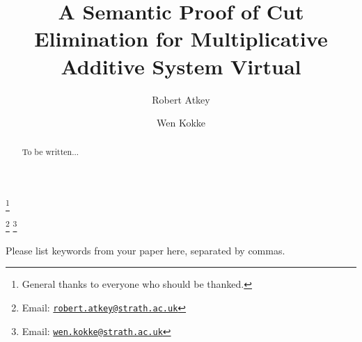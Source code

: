 \documentclass[twoside,11pt]{entics}
\begin{document}
\begin{frontmatter}
  \title{A Semantic Proof of Cut Elimination for Multiplicative Additive System Virtual}
  \thanks[ALL]{General thanks to everyone who should be thanked.}
  \author{Robert Atkey}
  \author{Wen Kokke}
  \address[msp]{%
    Mathematically Structured Programming\\
    Computer and Information Sciences\\
    University of Strathclyde\\
    Glasgow, Scotland, UK}
  \thanks[bobemail]%
  {Email: \href{robert.atkey@strath.ac.uk}%
    {\texttt{\normalshape robert.atkey@strath.ac.uk}}}
  \thanks[wenemail]%
  {Email: \href{wen.kokke@strath.ac.uk}%
    {\texttt{\normalshape wen.kokke@strath.ac.uk}}}
  \begin{abstract}
    To be written...
  \end{abstract}
  \begin{keyword}
    Please list keywords from your paper here, separated by commas.
  \end{keyword}
\end{frontmatter}



\cite{Horne15:mav,Okada99:psc}



\end{document}
